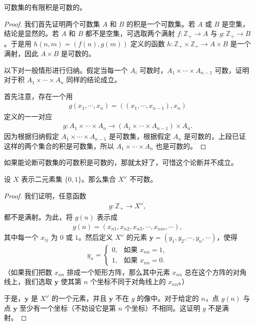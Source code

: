 \documentclass[../../main.tex]{subfiles}
\begin{document}
\begin{theorem}[可数集的有限积]\label{theorem:ch01-可数积}
可数集的有限积是可数的。
\end{theorem}

\begin{proof}
我们首先证明两个可数集 $A$ 和 $B$ 的积是一个可数集。若 $A$ 或 $B$ 是空集，结论是显然的。若 $A$ 和 $B$ 都不是空集，可选取两个满射 $f: \mathbb{Z}_{+} \longrightarrow A$ 与 $g: \mathbb{Z}_{+} \longrightarrow B$。于是用 $h(n, m) = (f(n), g(m))$ 定义的函数 $h: \mathbb{Z}_{+} \times \mathbb{Z}_{+} \longrightarrow A \times B$ 是一个满射，因此 $A \times B$ 是可数的。

以下对一般情形进行归纳。假定当每一个 $A_{i}$ 可数时，$A_{1} \times \cdots \times A_{n-1}$ 可数，证明对于积 $A_{1} \times \cdots \times A_{n}$ 同样的结论成立。

首先注意，存在一个用
\begin{align*}
g(x_{1}, \cdots, x_{n}) = ((x_{1}, \cdots, x_{n-1}), x_{n})
\end{align*}
定义的一一对应
\begin{align*}
g: A_{1} \times \cdots \times A_{n} \longrightarrow (A_{1} \times \cdots \times A_{n-1}) \times A_{n}.
\end{align*}
因为根据归纳假定 $A_{1} \times \cdots \times A_{n-1}$ 是可数集，根据假定 $A_{n}$ 是可数的，上段已证这样的两个集合的积是可数集，所以 $A_{1} \times \cdots \times A_{n}$ 也是可数的。
\end{proof}

如果能论断可数集的可数积是可数的，那就太好了，可惜这个论断并不成立。

\begin{theorem}\label{theorem:ch01-二元不可数}
设 $X$ 表示二元素集 $\{0, 1\}$。那么集合 $X^{\omega}$ 不可数。
\end{theorem}

\begin{proof}
我们证明，任意函数
\begin{align*}
g: \mathbb{Z}_{+} \longrightarrow X^{\omega},
\end{align*}
都不是满射。为此，将 $g(n)$ 表示成
\begin{align*}
g(n) = (x_{n1}, x_{n2}, x_{n3}, \cdots, x_{nm}, \cdots),
\end{align*}
其中每一个 $x_{ij}$ 为 $0$ 或 $1$。然后定义 $X^{\omega}$ 的元素 $\boldsymbol{y} = (y_{1}, y_{2}, \cdots, y_{n}, \cdots)$，使得
\begin{align*}
y_{n} =
\begin{cases}
0, & \text{如果 } x_{nn} = 1,\\
1, & \text{如果 } x_{nn} = 0.
\end{cases}
\end{align*}
（如果我们把数 $x_{nn}$ 排成一个矩形方阵，那么其中元素 $x_{nn}$ 总在这个方阵的对角线上，我们选取 $\boldsymbol{y}$ 使其第 $n$ 个坐标不同于对角线上的 $x_{nn}$。）

于是，$\boldsymbol{y}$ 是 $X^{\omega}$ 的一个元素，并且 $\boldsymbol{y}$ 不在 $g$ 的像中。对于给定的 $n$，点 $g(n)$ 与点 $\boldsymbol{y}$ 至少有一个坐标（不妨设它是第 $n$ 个坐标）不相同。这证明 $g$ 不是满射。
\end{proof}
\end{document}
